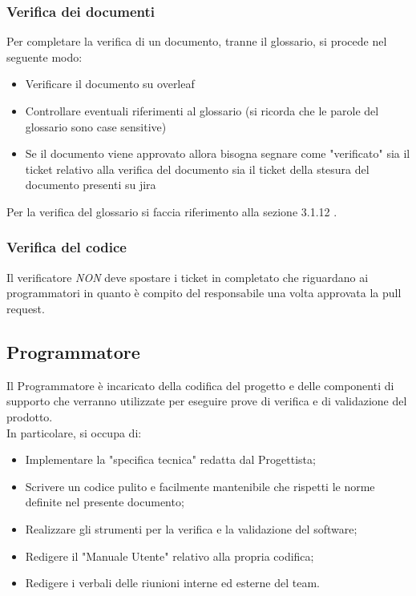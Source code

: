 \subsubsection{Verifica dei documenti}
Per completare la verifica di un documento, tranne il glossario, si procede nel seguente modo:
\begin{itemize}
    \item Verificare il documento su overleaf
    \item Controllare eventuali riferimenti al glossario (si ricorda che le parole del glossario sono case sensitive)
    \item Se il documento viene approvato allora bisogna segnare come "verificato" sia il ticket relativo alla verifica del documento sia il ticket della stesura del documento presenti su jira
\end{itemize}
Per la verifica del glossario si faccia riferimento alla sezione 3.1.12 .
\subsubsection{Verifica del codice}
Il verificatore \emph{NON} deve spostare i ticket in completato che riguardano ai programmatori in quanto è compito del responsabile una volta approvata la pull request.
\subsection{Programmatore}
Il Programmatore è incaricato della codifica del progetto e delle componenti di supporto che verranno utilizzate per eseguire prove di verifica e di validazione del prodotto. \\
In particolare, si occupa di:
\begin{itemize}
    \item Implementare la "specifica tecnica" redatta dal Progettista;
    \item Scrivere un codice pulito e facilmente mantenibile che rispetti le norme definite nel presente documento;
    \item Realizzare gli strumenti per la verifica e la validazione del software;
    \item Redigere il "Manuale Utente" relativo alla propria codifica;
    \item Redigere i verbali delle riunioni interne ed esterne del team.
\end{itemize}
